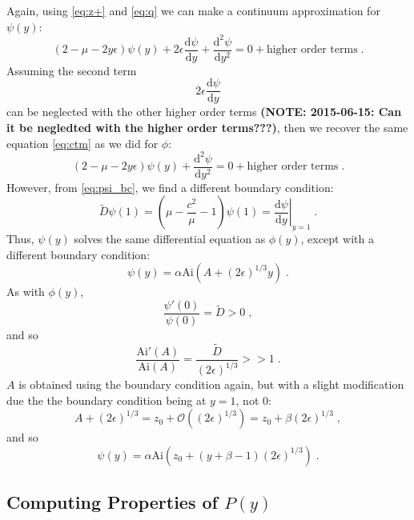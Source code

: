 \documentclass[a4paper,10pt]{article}
\newcommand{\D}{\mathrm{d}}
\newcommand{\Or}{\mathcal{O}}
\newcommand{\Ai}{\mathrm{Ai}}
\begin{document}
Again, using \eqref{eq:z+} and \eqref{eq:q} we can make a continuum approximation for $\psi(y)$:
\begin{equation}
  (2-\mu - 2y\epsilon) \psi(y) + 2\epsilon \frac{\D \psi}{\D y} + \frac{\D^2 \psi}{\D y^2} = 0 + \mbox{higher order terms} \;.
\end{equation}
Assuming the second term
\begin{equation*}
  2\epsilon \frac{\D \psi}{\D y}
\end{equation*}
can be neglected with the other higher order terms {\bf (NOTE: 2015-06-15: Can it be negledted with the higher order terms???)}, then we recover the same equation \eqref{eq:ctm} as we did for $\phi$: 
\begin{equation}\label{eq:ctm_psi}
  (2-\mu - 2y\epsilon) \psi(y) + \frac{\D^2 \psi}{\D y^2} = 0 + \mbox{higher order terms} \;.
\end{equation}
However, from \eqref{eq:psi_bc}, we find a different boundary condition:
\begin{equation}
   \tilde{D}\psi(1) = \left(\mu - \frac{c^2}{\mu} - 1 \right) \psi(1) = \left. \frac{ \D \psi }{\D y} \right|_{y=1} \;.
\end{equation}
Thus, $\psi(y)$ solves the same differential equation as $\phi(y)$, except with a different boundary condition:
\begin{equation}\label{eq:psi_gen_soln}
  \psi(y) = \alpha \Ai(A + (2\epsilon)^{1/3}y) \;.
\end{equation}
As with $\phi(y)$,
\begin{equation}
 \frac{\psi'(0)}{\psi(0)} = \tilde{D} > 0 \;,
\end{equation}
and so
\begin{equation}
  \frac{\Ai'(A)}{\Ai(A)} = \frac{\tilde{D}}{(2\epsilon)^{1/3}} >> 1 \;.
\end{equation}
$A$ is obtained using the boundary condition again, but with a slight modification due the the boundary condition being at $y=1$, not $0$:
\begin{equation}
  A +(2\epsilon)^{1/3} = z_0 + \Or( (2\epsilon)^{1/3} )  = z_0 + \beta (2\epsilon)^{1/3} \;,
\end{equation}
and so
\begin{equation}
  \psi(y) = \alpha \Ai(z_0 + (y+\beta-1)(2\epsilon)^{1/3}) \;.
\end{equation}


\subsection{Computing Properties of $P(y)$}
\end{document}
